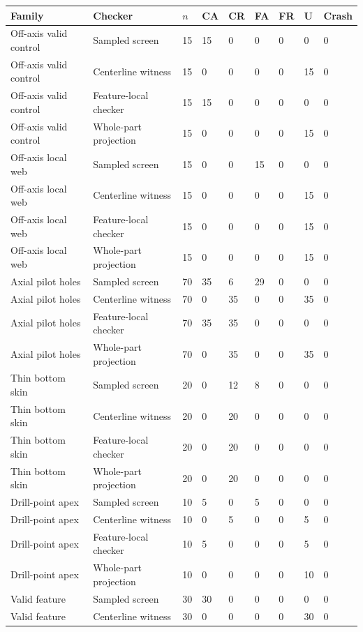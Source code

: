 \begin{longtable}{lllllllll}
\toprule
Family & Checker & $n$ & CA & CR & FA & FR & U & Crash \\
\midrule
\endhead
Off-axis valid control & Sampled screen & 15 & 15 & 0 & 0 & 0 & 0 & 0 \\
Off-axis valid control & Centerline witness & 15 & 0 & 0 & 0 & 0 & 15 & 0 \\
Off-axis valid control & Feature-local checker & 15 & 15 & 0 & 0 & 0 & 0 & 0 \\
Off-axis valid control & Whole-part projection & 15 & 0 & 0 & 0 & 0 & 15 & 0 \\
Off-axis local web & Sampled screen & 15 & 0 & 0 & 15 & 0 & 0 & 0 \\
Off-axis local web & Centerline witness & 15 & 0 & 0 & 0 & 0 & 15 & 0 \\
Off-axis local web & Feature-local checker & 15 & 0 & 0 & 0 & 0 & 15 & 0 \\
Off-axis local web & Whole-part projection & 15 & 0 & 0 & 0 & 0 & 15 & 0 \\
Axial pilot holes & Sampled screen & 70 & 35 & 6 & 29 & 0 & 0 & 0 \\
Axial pilot holes & Centerline witness & 70 & 0 & 35 & 0 & 0 & 35 & 0 \\
Axial pilot holes & Feature-local checker & 70 & 35 & 35 & 0 & 0 & 0 & 0 \\
Axial pilot holes & Whole-part projection & 70 & 0 & 35 & 0 & 0 & 35 & 0 \\
Thin bottom skin & Sampled screen & 20 & 0 & 12 & 8 & 0 & 0 & 0 \\
Thin bottom skin & Centerline witness & 20 & 0 & 20 & 0 & 0 & 0 & 0 \\
Thin bottom skin & Feature-local checker & 20 & 0 & 20 & 0 & 0 & 0 & 0 \\
Thin bottom skin & Whole-part projection & 20 & 0 & 20 & 0 & 0 & 0 & 0 \\
Drill-point apex & Sampled screen & 10 & 5 & 0 & 5 & 0 & 0 & 0 \\
Drill-point apex & Centerline witness & 10 & 0 & 5 & 0 & 0 & 5 & 0 \\
Drill-point apex & Feature-local checker & 10 & 5 & 0 & 0 & 0 & 5 & 0 \\
Drill-point apex & Whole-part projection & 10 & 0 & 0 & 0 & 0 & 10 & 0 \\
Valid feature & Sampled screen & 30 & 30 & 0 & 0 & 0 & 0 & 0 \\
Valid feature & Centerline witness & 30 & 0 & 0 & 0 & 0 & 30 & 0 \\

\end{longtable}
